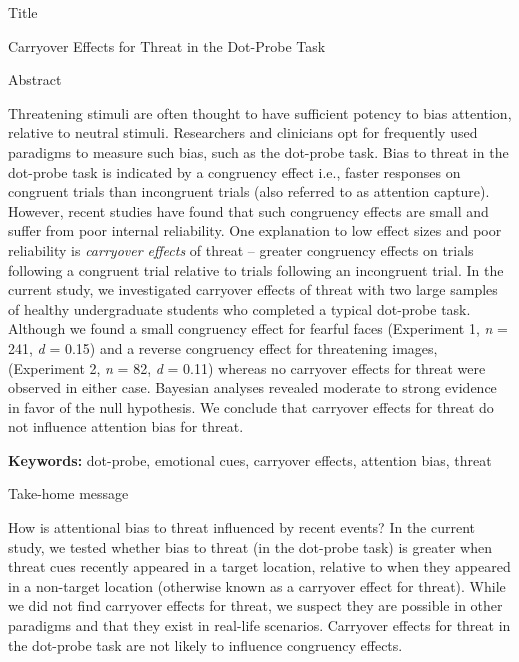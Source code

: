 \documentclass{article}
\begin{document}
	Title



	Carryover Effects for Threat in the Dot-Probe Task







	Abstract



	Threatening stimuli are often thought to have sufficient potency to bias attention, relative to neutral stimuli. Researchers and clinicians opt for frequently used paradigms to measure such bias, such as the dot-probe task. Bias to threat in the dot-probe task is indicated by a congruency effect i.e., faster responses on congruent trials than incongruent trials (also referred to as attention capture). However, recent studies have found that such congruency effects are small and suffer from poor internal reliability. One explanation to low effect sizes and poor reliability is \emph{carryover effects} of threat – greater congruency effects on trials following a congruent trial relative to trials following an incongruent trial. In the current study, we investigated carryover effects of threat with two large samples of healthy undergraduate students who completed a typical dot-probe task. Although we found a small congruency effect for fearful faces (Experiment 1, \emph{n} = 241, \emph{d }= 0.15) and a reverse congruency effect for threatening images, (Experiment 2, \emph{n }= 82, \emph{d }= 0.11) whereas no carryover effects for threat were observed in either case. Bayesian analyses revealed moderate to strong evidence in favor of the null hypothesis. We conclude that carryover effects for threat do not influence attention bias for threat.







	\textbf{Keywords:} dot-probe, emotional cues, carryover effects, attention bias, threat















	Take-home message



	How is attentional bias to threat influenced by recent events? In the current study, we tested whether bias to threat (in the dot-probe task) is greater when threat cues recently appeared in a target location, relative to when they appeared in a non-target location (otherwise known as a carryover effect for threat). While we did not find carryover effects for threat, we suspect they are possible in other paradigms and that they exist in real-life scenarios. Carryover effects for threat in the dot-probe task are not likely to influence congruency effects.
\end{document}
